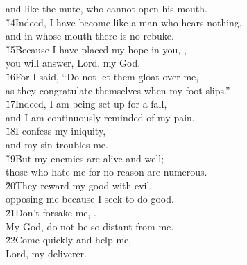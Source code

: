 \begin{poetry}
\poemll    and like the mute, who cannot open his mouth. \\
\poeml \v{14}Indeed, I have become like a man who hears nothing, \\
\poemll    and in whose mouth there is no rebuke. \\
\poeml \v{15}Because I have placed my hope in you, , \\
\poemll    you will answer, Lord, my God. \\
\poeml \v{16}For I said, ``Do not let them gloat over me, \\
\poemll    as they congratulate themselves when my foot slips.'' \\
\poeml \v{17}Indeed, I am being set up for a fall, \\
\poemll    and I am continuously reminded of my pain. \\
\poeml \v{18}I confess my iniquity, \\
\poemll    and my sin troubles me. \\
\poeml \v{19}But my enemies are alive and well; \\
\poemll    those who hate me for no reason are numerous. \\
\poeml \v{20}They reward my good with evil, \\
\poemll    opposing me because I seek to do good. \\
\poeml \v{21}Don't forsake me, . \\
\poemll    My God, do not be so distant from me. \\
\poeml \v{22}Come quickly and help me, \\
\poemll    Lord, my deliverer.
\end{poetry}

